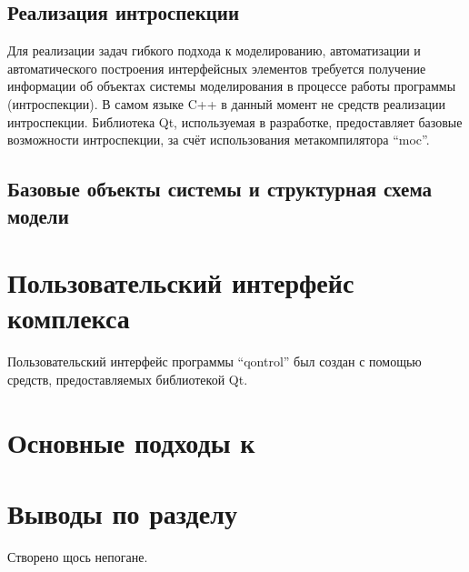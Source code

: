\subsection{Реализация интроспекции}

Для реализации задач гибкого подхода к моделированию, автоматизации
и автоматического построения интерфейсных элементов
требуется получение информации об объектах системы моделирования
в процессе работы программы (интроспекции).
В самом языке C++ в данный момент не средств реализации интроспекции.
Библиотека Qt, используемая в разработке, предоставляет
базовые возможности интроспекции, за счёт использования метакомпилятора ``moc''.

\subsection{Базовые объекты системы и структурная схема модели}



\section{Пользовательский интерфейс комплекса} %

Пользовательский интерфейс программы ``qontrol'' был создан с помощью
средств, предоставляемых библиотекой Qt.

\section{Основные подходы к } %

\section{Выводы по разделу} %

Створено щось непогане.

